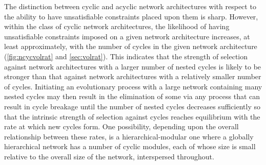 The distinction between cyclic and acyclic network architectures with respect to the ability to have unsatisfiable constraints placed upon them is sharp. However, within the class of cyclic network architectures, the likelihood of having unsatisfiable constraints imposed on a given network architecture increases, at least approximately, with the number of cycles in the given network architecture (\ref{fig:ncycvolrat} and \ref{sec:volrat}). This indicates that the strength of selection against network architectures with a larger number of nested cycles is likely to be stronger than that against network architectures with a relatively smaller number of cycles. Initiating an evolutionary process with a large network containing many nested cycles may then result in the elimination of some via any process that can result in cycle breakage until the number of nested cycles decreases sufficiently so that the intrinsic strength of selection against cycles reaches equilibrium with the rate at which new cycles form. One possibility, depending upon the overall relationship between these rates, is a hierarchical-modular one where a globally hierarchical network has a number of cyclic modules, each of whose size is small relative to the overall size of the network, interspersed throughout.
